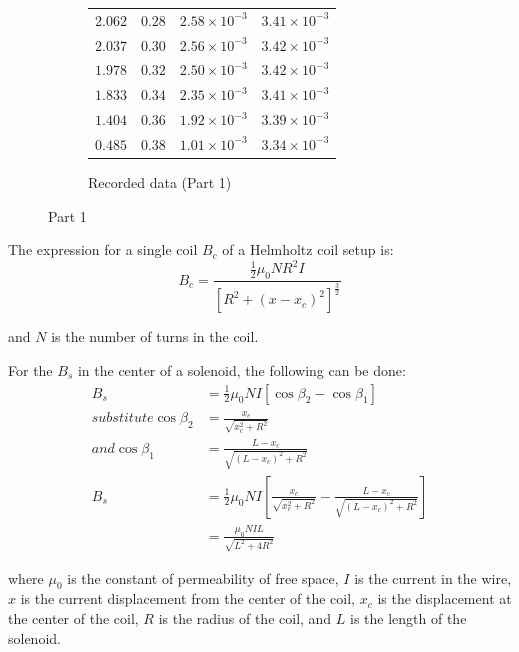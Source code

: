 \documentclass[12pt]{article}
\begin{document}
\begin{figure}[!ht]
\begin{subfigure}{0.5\textwidth}
\begin{tabular}{|r|r|r|r|}
            $2.062$ & $0.28$ & $2.58\times10^{-3}$ & $3.41\times10^{-3}$ \\
            $2.037$ & $0.30$ & $2.56\times10^{-3}$ & $3.42\times10^{-3}$ \\
            $1.978$ & $0.32$ & $2.50\times10^{-3}$ & $3.42\times10^{-3}$ \\
            $1.833$ & $0.34$ & $2.35\times10^{-3}$ & $3.41\times10^{-3}$ \\
            $1.404$ & $0.36$ & $1.92\times10^{-3}$ & $3.39\times10^{-3}$ \\
            $0.485$ & $0.38$ & $1.01\times10^{-3}$ & $3.34\times10^{-3}$ \\ \hline
        \end{tabular}
        \caption{Recorded data (Part 1)}
    \end{subfigure}
    \caption{Part 1}
    \label{fig:part1_results}
\end{figure}
\pagebreak
The expression for a single coil $B_c$ of a Helmholtz coil setup is:
\begin{equation*}
    B_c = \frac{\frac{1}{2}\mu_0NR^2I}{[R^2+(x-x_c)^2]^\frac{3}{2}}
\end{equation*}

and $N$ is the number of turns in the coil.

For the $B_s$ in the center of a solenoid, the following can be done:
\begin{equation*}
    \begin{aligned}
        B_s                    & = \frac{1}{2}\mu_0NI[\cos\beta_2-\cos\beta_1]                                                      \\
        substitute \cos\beta_2 & = \frac{x_c}{\sqrt{x_c^2 + R^2}}                                                                   \\
        and \cos\beta_1        & =\frac{L-x_c}{\sqrt{(L-x_c)^2+R^2}}                                                                \\
        B_s                    & = \frac{1}{2}\mu_0NI\left[\frac{x_c}{\sqrt{x_c^2 + R^2}}-\frac{L-x_c}{\sqrt{(L-x_c)^2+R^2}}\right] \\
                               & = \frac{\mu_0NIL}{\sqrt{L^2+4R^2}}
    \end{aligned}
\end{equation*}

where $\mu_0$ is the constant of permeability of free space, $I$ is the current
in the wire, $x$ is the current displacement from the center of the coil, $x_c$
is the displacement at the center of the coil, $R$ is the radius of the coil,
and $L$ is the length of the solenoid.
\end{document}
